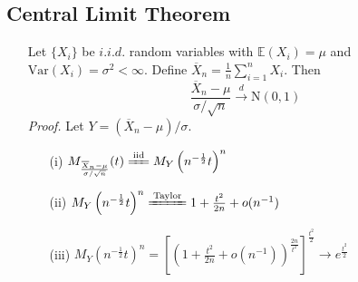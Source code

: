 \documentclass[%
 aip,
 jmp,%
 amsmath,amssymb,
 reprint,%
]{revtex4-1}
\newenvironment{note}{\color{gray}\footnotesize}{}
\def\E{\mathbb{E}}
\def\Var{\mathrm{Var}}
\def\normal{\mathrm{N}}
\newcommand{\eqtext}[1]{\xlongequal{\text{#1}}}%
\begin{document}
\subsection{Central Limit Theorem}
\begin{enumerate}
  \item[] Let $\{X_i\}$ be $i.i.d.$ random variables with
  $\E(X_i) = \mu$ and $\Var(X_i) = \sigma^2 <\infty$.
  Define $\overline{X}_n = \frac{1}{n}\sum_{i=1}^{n}X_i$. Then
  $$ \frac{\overline{X}_n - \mu}{\sigma/\sqrt{n}} \overset{d}{\to} \normal(0,1) $$
  \begin{note}
    \emph{Proof.} Let $Y =(\overline{X}_n - \mu)/\sigma$.
    \begin{enumerate}
      \item[(i)] $M_{\frac{\overline{X}_n - \mu}{\sigma/\sqrt{n}}}(t) \eqtext{iid} M_Y\left(n^{-\frac{1}{2}}t\right)^n$
      \item[(ii)]$M_Y\left(n^{-\frac{1}{2}}t\right)^n \eqtext{Taylor} 1 + \frac{t^2}{2n} + o(n^{-1})$
      \item[(iii)] $M_Y\left(n^{-\frac{1}{2}}t\right)^n = \left[\left(1 + \frac{t^2}{2n} + o(n^{-1})\right)^{\frac{2n}{t^2}}\right]^{\frac{t^2}{2}}\to e^{\frac{t^2}{2}}$
    \end{enumerate}
  \end{note}
\end{enumerate}
\end{document}
